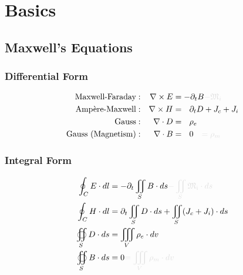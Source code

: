 \documentclass{article}
\begin{document}
\section{Basics}
\subsection{Maxwell's Equations}
\subsubsection*{Differential Form}
    \begin{subequations}\label{eq:Maxwell}
        \begin{align}
            \text{Maxwell-Faraday} & : & \nabla \times E &= - \partial_t B \begingroup \textcolor{vanish}{- \mathfrak{M}_i } \endgroup \label{eq:MaxwellFaraday} \\
            \text{Amp\`ere-Maxwell} & : & \nabla \times H &= \ \ \partial_t D + J_{c} + J_{i} \label{eq:AmpereMaxwell} \\
            \text{Gauss} & : & \nabla \cdot D &= \ \ \rho_e \label{eq:GaussElectric} \\
            \text{Gauss (Magnetism)} & : & \nabla \cdot B &= \ \ 0 \begingroup \textcolor{vanish}{\quad = \rho_m} \endgroup \label{eq:GaussMagnetic}
        \end{align}
    \end{subequations}
\subsubsection*{Integral Form}
    \begin{subequations}\label{eq:MaxwellIntegral}
        \begin{align}
            \oint_C E \cdot dl &=  - \partial_t \iint_S B \cdot ds \begingroup \textcolor{vanish}{- \iint_S \mathfrak{M_i} \cdot ds} \endgroup \label{eq:MaxwellFaradayIntegral} \\
            \oint_C H \cdot dl &=  \partial_t \iint_S D \cdot ds + \iint_S ( J_c + J_i ) \cdot ds \label{eq:AmpereMaxwellIntegral} \\
            \oiint_S D \cdot ds &= \iiint_V \rho_e \cdot dv \label{eq:GaussElectricIntegral} \\
            \oiint_S B \cdot ds &= 0 \begingroup \textcolor{vanish}{= \iiint_V \rho_m \cdot dv} \endgroup \label{eq:GaussMagneticIntegral}
        \end{align}
    \end{subequations}
\end{document}
